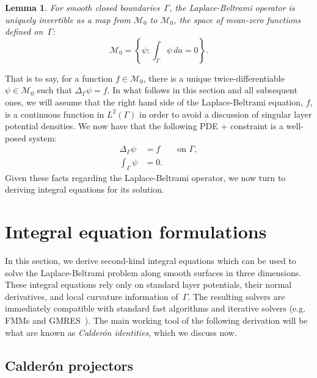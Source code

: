 \documentclass[11pt]{article}
\newcommand{\surflap}{\Delta_\Gamma}
\newcommand{\cM}{\mathcal M}
\newtheorem{lemma}[theorem]{Lemma}
\numberwithin{equation}{section}
\begin{document}
\begin{lemma}
For smooth closed boundaries~$\Gamma$, the Laplace-Beltrami operator
is uniquely invertible as a map from $\cM_0$ to $\cM_0$, the space of
mean-zero functions defined on~$\Gamma$:
\begin{equation}
\cM_0 = \left\{ \psi : \int_\Gamma \psi \, da = 0 \right\}.
\end{equation}
\end{lemma}
That is to say, for a function $f \in \cM_0$, there is a unique
twice-differentiable $\psi \in \cM_0$ such that $\surflap \psi = f$.
In what follows in this section and all subsequent ones, we will
assume that the right hand side of the Laplace-Beltrami equation, $f$,
is a continuous function in $ L^2(\Gamma)$ in order to avoid a
discussion of singular
layer potential densities.
We now have that the
following PDE + constraint is a well-posed system:
\begin{equation}
  \begin{aligned}
    \surflap \psi &= f \qquad \text{on }\Gamma,\\
    \int_\Gamma \psi &= 0.
  \end{aligned}
\end{equation}
Given these facts regarding the Laplace-Beltrami operator, we now turn
to deriving integral equations for its solution.






\section{Integral equation formulations}
\label{sec_integral}

In this section, we derive second-kind integral equations which can be
used to solve the Laplace-Beltrami problem along smooth surfaces in
three dimensions.
These integral equations  rely only on standard layer
potentials, their normal derivatives, and local curvature information
of~$\Gamma$.
The resulting solvers are immediately compatible with
standard fast algorithms and iterative solvers (e.g. FMMs and 
GMRES~\cite{saad-1986}).
The main working tool of the following
derivation will be what are known as \emph{Calder\'on identities},
which we discuss now.



\subsection{Calder\'on projectors}
\label{sec_calderon}
\end{document}
